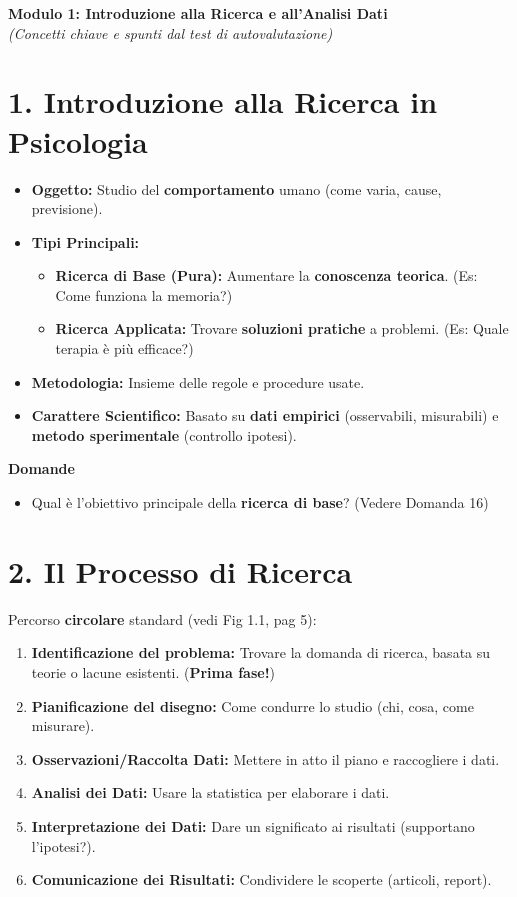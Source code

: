 \documentclass[12pt, a4paper]{article}
\newenvironment{reflectionbox}{%
    \begin{framed}\par\medskip\noindent
    \textbf{\color{boxtitlecolor}Domande} \par
    \begin{itemize}[leftmargin=*, label=$\blacktriangleright$]
}{%
    \end{itemize}\par\medskip
    \end{framed}
}
\begin{document}
\begin{center}
    \Large\textbf{Modulo 1: Introduzione alla Ricerca e all'Analisi Dati} \\
    \vspace{0.5cm}
    \large\textit{(Concetti chiave e spunti dal test di autovalutazione)}
\end{center}

\section*{1. Introduzione alla Ricerca in Psicologia}
\begin{itemize}
    \item \textbf{Oggetto:} Studio del \textbf{comportamento} umano (come varia, cause, previsione).
    \item \textbf{Tipi Principali:}
        \begin{itemize}
            \item \textbf{Ricerca di Base (Pura):} Aumentare la \textbf{conoscenza teorica}. (Es: Come funziona la memoria?)
            \item \textbf{Ricerca Applicata:} Trovare \textbf{soluzioni pratiche} a problemi. (Es: Quale terapia è più efficace?)
        \end{itemize}
    \item \textbf{Metodologia:} Insieme delle regole e procedure usate.
    \item \textbf{Carattere Scientifico:} Basato su \textbf{dati empirici} (osservabili, misurabili) e \textbf{metodo sperimentale} (controllo ipotesi).
\end{itemize}

\begin{reflectionbox}
    \item Qual è l'obiettivo principale della \textbf{ricerca di base}? (Vedere Domanda 16)
\end{reflectionbox}

\section*{2. Il Processo di Ricerca}
Percorso \textbf{circolare} standard (vedi Fig 1.1, pag 5):
\begin{enumerate}
    \item \textbf{Identificazione del problema:} Trovare la domanda di ricerca, basata su teorie o lacune esistenti. (\textbf{Prima fase!})
    \item \textbf{Pianificazione del disegno:} Come condurre lo studio (chi, cosa, come misurare).
    \item \textbf{Osservazioni/Raccolta Dati:} Mettere in atto il piano e raccogliere i dati.
    \item \textbf{Analisi dei Dati:} Usare la statistica per elaborare i dati.
    \item \textbf{Interpretazione dei Dati:} Dare un significato ai risultati (supportano l'ipotesi?).
    \item \textbf{Comunicazione dei Risultati:} Condividere le scoperte (articoli, report).
\end{enumerate}
\end{document}
